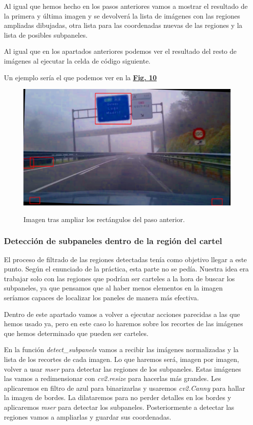 \documentclass[a4paper, 12pt]{article}
\begin{document}
Al igual que hemos hecho en los pasos anteriores vamos a mostrar el resultado de la primera y última imagen y se devolverá la lista de imágenes con las regiones ampliadas dibujadas, otra lista para las coordenadas nuevas de las regiones y la lista de posibles subpaneles. 

Al igual que en los apartados anteriores podemos ver el resultado del resto de imágenes al ejecutar la celda de código siguiente. 

Un ejemplo sería el que podemos ver en la \textbf{\hyperref[fig:RectangulosFiltradosExtendidos]{Fig. 10}}

\begin{figure}[h]
	\centering
	\caption{Imagen tras ampliar los rectángulos del paso anterior.}\vspace{0.5cm}
	\includegraphics[width=0.6\linewidth]{img/RectangulosFiltradosExtendidos}
	\label{fig:RectangulosFiltradosExtendidos}
\end{figure}


\subsubsection{Detección de subpaneles dentro de la región del cartel}
El proceso de filtrado de las regiones detectadas tenía como objetivo llegar a este punto. Según el enunciado de la práctica, esta parte no se pedía. Nuestra idea era trabajar solo con las regiones que podrían ser carteles a la hora de buscar los subpaneles, ya que pensamos que al haber menos elementos en la imagen seríamos capaces de localizar los paneles de manera más efectiva.

Dentro de este apartado vamos a volver a ejecutar acciones parecidas a las que hemos usado ya, pero en este caso lo haremos sobre los recortes de las imágenes que hemos determinado que pueden ser carteles. 

En la función \textit{detect\_subpanels} vamos a recibir las imágenes normalizadas y la lista de los recortes de cada imagen. Lo que haremos será, imagen por imagen, volver a usar \textit{mser} para detectar las regiones de los subpaneles. Estas imágenes las vamos a redimensionar con \textit{cv2.resize} para hacerlas más grandes. Les aplicaremos en filtro de azul para binarizarlas y usaremos \textit{cv2.Canny} para hallar la imagen de bordes. La dilataremos para no perder detalles en los bordes y aplicaremos \textit{mser} para detectar los subpaneles. Posteriormente a detectar las regiones vamos a ampliarlas y guardar sus coordenadas. 
\end{document}
